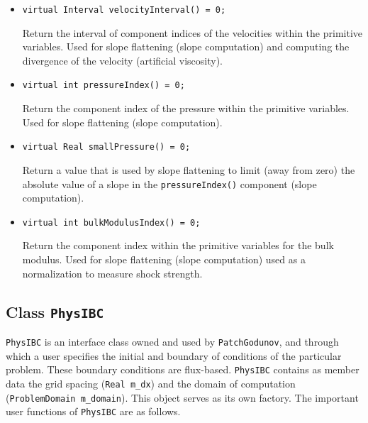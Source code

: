 \begin{itemize}
\item \begin{small}\begin{verbatim}
virtual Interval velocityInterval() = 0;
\end{verbatim}\end{small}
Return the interval of component indices of the velocities within the
primitive variables. Used for slope flattening (slope computation) and
computing the divergence of the velocity (artificial viscosity).

\item \begin{small}\begin{verbatim}
virtual int pressureIndex() = 0;
\end{verbatim}\end{small}
Return the component index of the pressure within the primitive
variables.  Used for slope flattening (slope computation).

\item \begin{small}\begin{verbatim}
virtual Real smallPressure() = 0;
\end{verbatim}\end{small}
Return a value that is used by slope flattening to limit (away from
zero) the absolute value of a slope in the \verb/pressureIndex()/ component
(slope computation).

\item \begin{small}\begin{verbatim}
virtual int bulkModulusIndex() = 0;
\end{verbatim}\end{small}
Return the component index within the primitive variables for the
bulk modulus.  Used for slope flattening (slope computation) used
as a normalization to measure shock strength.

\end{itemize}


\subsection{Class {\tt PhysIBC}} \label{sec:physIBC}

{\tt PhysIBC} is an interface class owned and used by {\tt PatchGodunov},
and through which a user specifies the initial and boundary of conditions
of the particular problem.  These boundary conditions are 
flux-based.  {\tt PhysIBC} contains as member data the 
grid spacing (\verb/Real m_dx/) and the domain of computation
(\verb/ProblemDomain m_domain/).  This object serves as its own factory.
The important user functions of {\tt PhysIBC} are as follows.
 
